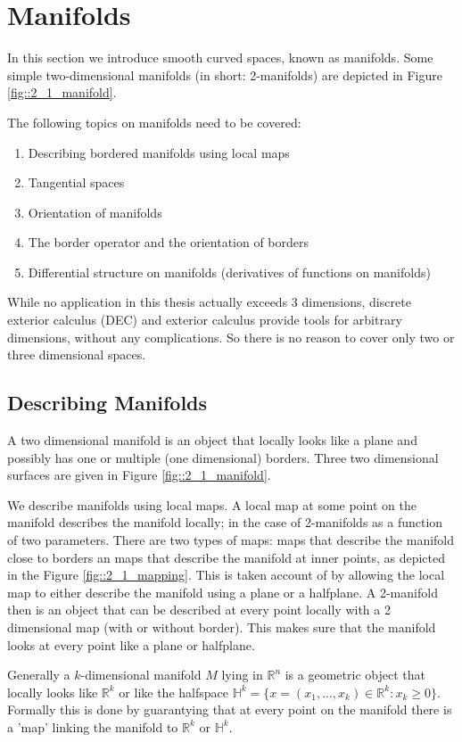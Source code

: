 \section{Manifolds}
\label{sec::2_Manifolds}
In this section we introduce smooth curved spaces, known as manifolds. Some simple two-dimensional manifolds (in short: 2-manifolds) are depicted in Figure \ref{fig::2_1_manifold}.

The following topics on manifolds need to be covered:
\begin{enumerate}
\item Describing bordered manifolds using local maps
\item Tangential spaces
\item Orientation of manifolds
\item The border operator and the orientation of borders
\item Differential structure on manifolds (derivatives of functions on manifolds)
\end{enumerate}

While no application in this thesis actually exceeds 3 dimensions, discrete exterior calculus (DEC) and exterior calculus provide tools for arbitrary dimensions, without any complications. So there is no reason to cover only two or three dimensional spaces. 
		
\subsection{Describing Manifolds}	
A two dimensional manifold is an object that locally looks like a plane and possibly has one or multiple (one dimensional) borders. Three two dimensional surfaces are given in Figure \ref{fig::2_1_manifold}.

We describe manifolds using local maps. A local map at some point on the manifold describes the manifold locally; in the case of 2-manifolds as a function of two parameters. There are two types of maps: maps that describe the manifold close to borders an maps that describe the manifold at inner points, as depicted in the Figure \ref{fig::2_1_mapping}. This is taken account of by allowing the local map to either describe the manifold using a plane or a halfplane. A 2-manifold then is an object that can be described at every point locally with a 2 dimensional map (with or without border). This makes sure that the manifold looks at every point like a plane or halfplane.


Generally a $k$-dimensional manifold $M$ lying in $\mathbb R^n$ is a geometric object that locally looks like $\mathbb R^k$ or like the halfspace $\mathbb H^k = \{x= (x_1,...,x_k) \in \mathbb R^k : x_k \geq 0\}$.  Formally this is done by guarantying that at every point on the manifold there is a 'map' linking the manifold to $\mathbb R^k$ or $\mathbb H^k$.
		
